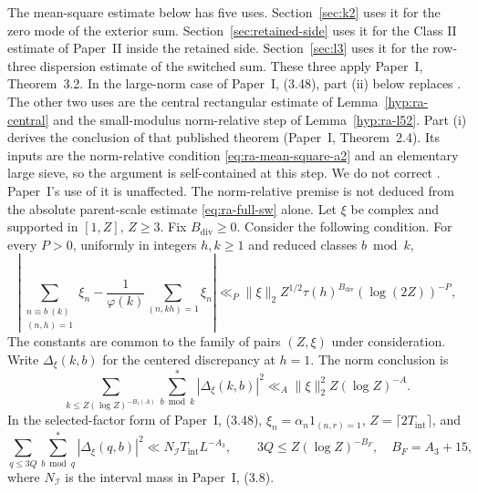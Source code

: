 The mean-square estimate below has five uses.
Section~\ref{sec:k2} uses it for the zero mode of the exterior sum.
Section~\ref{sec:retained-side} uses it for the Class II estimate of
Paper~II inside the retained side.
Section~\ref{sec:l3} uses it for the row-three dispersion estimate of the
switched sum. These three apply Paper~I, Theorem~3.2.
In the large-norm case of Paper~I, (3.48), part (ii) below replaces
\cite[Theorem~0(a)]{BFI86}. The other two uses are the central rectangular
estimate of Lemma~\ref{hyp:ra-central} and the small-modulus norm-relative
step of Lemma~\ref{hyp:ra-l52}. Part (i) derives the conclusion of that
published theorem (Paper~I, Theorem~2.4).
Its inputs are the norm-relative condition
\eqref{eq:ra-mean-square-a2} and
an elementary large sieve, so the argument is self-contained
at this step. We do not correct \cite{BFI86}.
Paper~I's use of it is unaffected. The norm-relative premise is not deduced from the
absolute parent-scale estimate \eqref{eq:ra-full-sw} alone.
Let \(\xi\) be complex and supported in \([1,Z]\), \(Z\ge3\). Fix
\(B_{\mathrm{div}}\ge0\). Consider the following condition.
For every
\(P>0\), uniformly in integers \(h,k\ge1\) and reduced classes
\(b\bmod k\),
\begin{equation}\label{eq:ra-mean-square-a2}
 \left|\sum_{\substack{n\equiv b\ (k)\\(n,h)=1}}\xi_n
 -\frac1{\varphi(k)}\sum_{(n,kh)=1}\xi_n\right|
 \ll_P\|\xi\|_2Z^{1/2}\tau(h)^{B_{\mathrm{div}}}(\log(2Z))^{-P},
\end{equation}
The constants are common to the family of pairs \((Z,\xi)\) under
consideration.
Write \(\Delta_\xi(k,b)\) for the centered discrepancy at \(h=1\). The norm conclusion is
\begin{equation}\label{eq:ra-transferred-mean-square}
 \sum_{k\le Z(\log Z)^{-B_1(A)}}\sum_{b\bmod k}^{*}
       |\Delta_\xi(k,b)|^2
 \ll_A\|\xi\|_2^2 Z(\log Z)^{-A}.
\end{equation}
In the selected-factor form of Paper~I, (3.48),
\(\xi_n=\alpha_n1_{(n,r)=1}\), \(Z=\lceil2T_{\mathrm{int}}\rceil\), and
\begin{equation}\label{eq:ra-mean-square-transfer}
 \sum_{q\le3Q}\sum_{b\bmod q}^{*}|\Delta_\xi(q,b)|^2
 \ll N_{\mathcal I}T_{\mathrm{int}} L^{-A_3},\qquad
 3Q\le Z(\log Z)^{-B_F},\quad B_F=A_3+15,
\end{equation}
where \(N_{\mathcal I}\) is the interval mass in Paper~I, (3.8).
